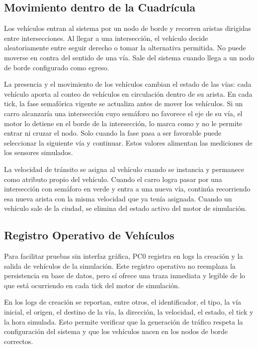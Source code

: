 \documentclass[12pt, a4paper]{article}
\let\oldtexttt\texttt
\renewcommand{\texttt}[1]{\oldtexttt{\seqsplit{#1}}}
\begin{document}
\subsection{Movimiento dentro de la Cuadrícula}

Los vehículos entran al sistema por un nodo de borde y recorren aristas dirigidas entre intersecciones. Al llegar a una intersección, el vehículo decide aleatoriamente entre seguir derecho o tomar la alternativa permitida. No puede moverse en contra del sentido de una vía. Sale del sistema cuando llega a un nodo de borde configurado como egreso.

La presencia y el movimiento de los vehículos cambian el estado de las vías: cada vehículo aporta al conteo de vehículos en circulación dentro de su arista. En cada tick, la fase semafórica vigente se actualiza antes de mover los vehículos. Si un carro alcanzaría una intersección cuyo semáforo no favorece el eje de su vía, el motor lo detiene en el borde de la intersección, lo marca como \texttt{EN\_COLA} y no le permite entrar ni cruzar el nodo. Solo cuando la fase pasa a ser favorable puede seleccionar la siguiente vía y continuar. Estos valores alimentan las mediciones de los sensores simulados.

La velocidad de tránsito se asigna al vehículo cuando se instancia y permanece como atributo propio del vehículo. Cuando el carro logra pasar por una intersección con semáforo en verde y entra a una nueva vía, continúa recorriendo esa nueva arista con la misma velocidad que ya tenía asignada. Cuando un vehículo sale de la ciudad, se elimina del estado activo del motor de simulación.

\subsection{Registro Operativo de Vehículos}

Para facilitar pruebas sin interfaz gráfica, PC0 registra en logs la creación y la salida de vehículos de la simulación. Este registro operativo no reemplaza la persistencia en base de datos, pero sí ofrece una traza inmediata y legible de lo que está ocurriendo en cada tick del motor de simulación.

En los logs de creación se reportan, entre otros, el identificador, el tipo, la vía inicial, el origen, el destino de la vía, la dirección, la velocidad, el estado, el tick y la hora simulada. Esto permite verificar que la generación de tráfico respeta la configuración del sistema y que los vehículos nacen en los nodos de borde correctos.
\end{document}
